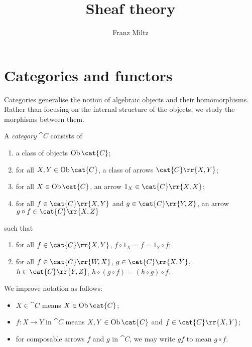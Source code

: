 \documentclass{article}
\author{Franz Miltz}
\title{Sheaf theory}
\begin{document}
\maketitle
\tableofcontents
\pagebreak

\printbibliography

\section{Categories and functors}\label{sec:categories_and_functors}

Categories generalise the notion of algebraic objects and their homomorphisms.
Rather than focusing on the internal structure of the objects, we study the
morphisms between them.

\begin{definition}\label{def:category}
  A \emph{category} $\cat C$ consists of
  \begin{enumerate}
    \item a class of objects $\Ob\cat{C}$;
    \item for all $X,Y\in\Ob\cat{C}$, a class of arrows $\cat{C}\rr{X,Y}$;
    \item for all $X\in\Ob\cat{C}$, an arrow $1_X\in\cat{C}\rr{X,X}$;
    \item for all $f\in\cat{C}\rr{X,Y}$ and $g\in\cat{C}\rr{Y,Z}$, an arrow
      $g\circ f\in\cat{C}\rr{X,Z}$
  \end{enumerate}
  such that
  \begin{enumerate}
    \item for all $f\in\cat{C}\rr{X,Y}$, $f\circ 1_X = f = 1_Y\circ f$;
    \item for all $f\in\cat{C}\rr{W,X}$, $g\in\cat{C}\rr{X,Y}$, $h\in\cat{C}\rr{Y,Z}$,
      $h\circ(g\circ f)=(h\circ g)\circ f$.
  \end{enumerate}
\end{definition}

\begin{notation}
  We improve notation as follows:
  \begin{itemize}
    \item $X\in\cat{C}$ means $X\in\Ob\cat{C}$;
    \item $f:X\to Y$ in $\cat{C}$ means $X,Y\in\Ob\cat{C}$ and $f\in\cat{C}\rr{X,Y}$;
    \item for composable arrows $f$ and $g$ in $\cat{C}$, we may write $gf$ to mean $g\circ f$.
  \end{itemize}
\end{notation}
\end{document}
